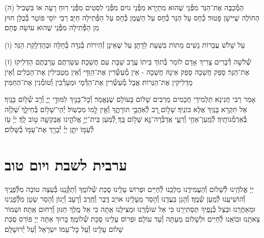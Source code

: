 \documentclass[twoside, openany, parskip=half, 11pt]{book}
\begin{document}
(ה) הַמְ֯כַבֶּה אֶת־הַנֵּר מִפְּ֯נֵי שֶׁהוּא מִתְיָרֵא מִפְּ֯נֵי גוֹיִם מִפְּ֯נֵי לִסְטִים מִפְּ֯נֵי רֽוּחַ רָעָה אוֹ בִּשְׁבִיל הַחוֹלֶה שֶׁיִּישָׁן פָּטוּר׃ כְּ֯חָס עַל הַנֵּר כְּ֯חָס עַל הַשֶּֽׁמֶן כְּ֯חָס עַל הַפְּ֯תִילָה חַיָּב׃ רַבִּי יוֹסֵי פּוֹטֵר בְּ֯כֻלָּן חוּץ מִן הַפְּ֯תִילָה מִפְּ֯נֵי שֶׁהוּא עוֹשָׂהּ פֶּחָם׃

(ו) עַל שָׁלֹשׁ עֲבֵרוֹת נָשִׁים מֵתוֹת בִּשְׁעַת לֵדָתָן׃ עַל שֶׁאֵינָן זְ֯הִירוֹת בְּ֯נִדָּה בְּ֯חַלָּה וּבְהַדְלָקַת הַנֵּר׃

(ז) שְׁ֯לֹשָׁה דְ֯בָרִים צָרִיךְ אָדָם לוֹמַר בְּ֯תוֹךְ בֵּיתוֹ עֶֽרֶב שַׁבָּת עִם חֲשֵׁכָה׃ עִשַׂרְתֶּם עֵרַבְתֶּם הַדְלִֽיקוּ אֶת־הַנֵּר׃ סָפֵק חֲשֵׁכָה סָפֵק אֵינָהּ חֲשֵׁכָה - אֵין מְ֯עַשְּׂ֯רִין אֶת־הַוַּדָּי וְ֯אֵין מַטְבִּילִין אֶת־הַכֵּלִים וְ֯אֵין מַדְלִיקִין אֶת־הַנֵּרוֹת׃ אֲבָל מְ֯עַשְּׂ֯רִין אֶת־הַדְּ֯מָי וּמְעָרְ֯בִין וְ֯טוֹמְ֯נִין אֶת־הַחַמִּין׃


 
אָמַר רַבִּי חֲנִינָא׃ תַּלְמִידֵי חֲכָמִים מַרְבִּים שָׁלוֹם בָּעוֹלָם שֶׁנֶּאֱמַר׃
וְ֯כׇל־בָּנַ֖יִךְ לִמּוּדֵ֣י יְיָ֑ וְ֯רַ֖ב שְׁ֯ל֥וֹם בָּנָֽיִךְ׃ אַל תִּקְרָא בָּנַֽיִךְ אֶלָּא בּוֹנַֽיִךְ׃ שָׁל֣וֹם רָ֭ב לְ֯אֹֽהֲבֵ֣י תוֹרָתֶ֑ךָ וְ֯אֵ֖ין לָ֣מוֹ מִכְשֽׁוֹל׃ יְ֯הִֽי־שָׁל֥וֹם בְּ֯חֵילֵ֑ךְ שַׁ֝לְוָ֗ה בְּ֯אַרְמְ֯נוֹתָֽיִךְ׃ לְ֯מַֽעַן־אַחַ֥י וְ֯רֵעָ֑י אֲדַבְּ֯רָה־נָּ֖א שָׁל֣וֹם בָּֽךְ׃ לְ֭֯מַעַן בֵּית־יְיָ֣ אֱלֹהֵ֑ינוּ אֲבַקְשָׁ֖ה ט֣וֹב לָֽךְ׃
יְיָ֗ עֹ֖ז לְ֯עַמּ֣וֹ יִתֵּ֑ן יְיָ֓ יְ֯בָרֵ֖ךְ אֶת־עַמּ֣וֹ בַ֯שָּׁלֽוֹם׃


\mournerskaddish

\vspace{\baselineskip}

{\let\clearpage\relax
\chapter[ערבית לשבת ויו״ט]{ ערבית לשבת ויום טוב }}

\barachu

\hamaarivaravim

\ahavasolam

\shema

\veahavta

\vehaya

\vayomer{}

\emesveemuna

יְיָ אֱלֹהֵֽינוּ לְ֯שָׁלוֹם וְ֯הַעֲמִידֵֽנוּ מַלְכֵּֽנוּ לְ֯חַיִּים וּפְרוֹשׂ עָלֵֽינוּ סֻכַּת שְׁ֯לוֹמֶֽךָ וְ֯תַקְּ֯נֵֽנוּ בְּ֯עֵצָה טוֹבָה מִלְּ֯פָנֶֽיךָ וְ֯הוֹשִׁיעֵֽנוּ לְ֯מַֽעַן שְׁ֯מֶֽךָ׃ וְ֯הָגֵן בַּעֲדֵֽנוּ וְ֯הָסֵר מֵעָלֵֽינוּ אוֹיֵב דֶּֽבֶר וְ֯חֶֽרֶב וְ֯רָעָב וְ֯יָגוֹן וְ֯הָסֵר שָׂטָן מִלְּ֯פָנֵֽינוּ וּמֵאַחֲרֵֽנוּ וּבְצֵל כְּ֯נָפֶֽיךָ תַּסְתִּירֵֽנוּ כִּי אֵל שׁוֹמְ֯רֵֽנוּ וּמַצִּילֵֽנוּ אַֽתָּה כִּי אֵל מֶֽלֶךְ חַנּוּן וְ֯רַחוּם אַֽתָּה׃ וּשְׁמוֹר צֵאתֵֽנוּ וּבוֹאֵֽנוּ לְ֯חַיִּים וּלְשָׁלוֹם מֵעַתָּה וְ֯עַד עוֹלָם׃ וּפְרוֹס עָלֵֽינוּ סֻכַּת שְׁ֯לוֹמֶֽךָ׃ בָּרוּךְ אַתָּה יְיָ פּוֹרֵס סֻכַּת שָׁלוֹם עָלֵֽינוּ וְ֯עַל כׇּל־עַמּוֹ יִשְׂרָאֵל וְ֯עַל יְ֯רוּשָׁלַ‍ִם׃
\end{document}
